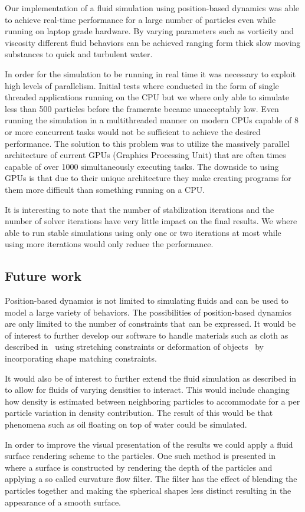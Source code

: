 Our implementation of a fluid simulation using position-based dynamics was able
to achieve real-time performance for a large number of particles even while
running on laptop grade hardware. By varying parameters such as vorticity and
viscosity different fluid behaviors can be achieved ranging form thick slow
moving substances to quick and turbulent water.

In order for the simulation to be running in real time it was necessary to
exploit high levels of parallelism. Initial tests where conducted in the form
of single threaded applications running on the CPU but we where only able to
simulate less than 500 particles before the framerate became unacceptably low.
Even running the simulation in a multithreaded manner on modern CPUs capable of
8 or more concurrent tasks would not be sufficient to achieve the desired
performance. The solution to this problem was to utilize the massively parallel
architecture of current GPUs (Graphics Processing Unit) that are often times
capable of over 1000 simultaneously executing tasks. The downside to using GPUs
is that due to their unique architecture they make creating programs for them
more difficult than something running on a CPU.

It is interesting to note that the number of stabilization iterations and the
number of solver iterations have very little impact on the final results. We
where able to run stable simulations using only one or two iterations at
most while using more iterations would only reduce the performance.

\subsection{Future work}
Position-based dynamics is not limited to simulating
fluids and can be used to model a large variety of behaviors. The possibilities
of position-based dynamics are only limited to the number of constraints that
can be expressed. It would be of interest to further develop our software to
handle materials such as cloth as described in~\cite{muller2007position} using
stretching constraints or deformation of objects~\cite{muller2005meshless} by
incorporating shape matching constraints.

It would also be of interest to further extend the fluid simulation as
described in~\cite{macklin2014unified} to allow for fluids of varying densities
to interact. This would include changing how density is estimated between
neighboring particles to accommodate for a per particle variation in density
contribution. The result of this would be that phenomena such as oil floating
on top of water could be simulated.

In order to improve the visual presentation of the results we could apply a
fluid surface rendering scheme to the particles. One such method is presented
in~\cite{van2009screen} where a surface is constructed by rendering the depth
of the particles and applying a so called curvature flow filter. The filter has
the effect of blending the particles together and making the spherical shapes
less distinct resulting in the appearance of a smooth surface.

